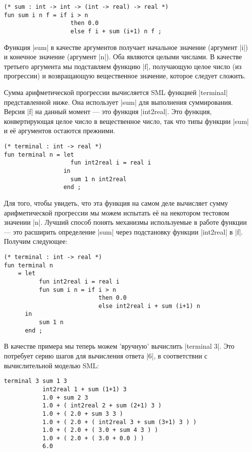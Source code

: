 \begin{lstlisting}[style=customml]
(* sum : int -> int -> (int -> real) -> real *)
fun sum i n f = if i > n
                   then 0.0
                   else f i + sum (i+1) n f ;
\end{lstlisting}

Функция \inline|sum| в качестве аргументов получает начальное значение (аргумент \inline|i|) и конечное значение (аргумент \inline|n|). Оба являются целыми числами. В качестве третьего аргумента мы подставляем функцию \inline|f|, получающую целое число (из прогрессии) и возвращающую вещественное значение, которое следует сложить.

Сумма арифметической прогрессии вычисляется SML функцией \inline|terminal| представленной ниже. Она использует \inline|sum| для выполнения суммирования. Версия \inline|f| на данный момент --- это функция \inline|int2real|. Это функция, конвертирующая целое число в вещественное число, так что типы функции \inline|sum| и её аргументов остаются прежними.

\begin{lstlisting}[style=customml]
(* terminal : int -> real *)
fun terminal n = let
                   fun int2real i = real i
                 in
                   sum 1 n int2real
                 end ;
\end{lstlisting}

Для того, чтобы увидеть, что эта функция на самом деле вычисляет сумму арифметической прогрессии мы можем испытать её на некотором тестовом значении \inline|n|. Лучший способ понять механизмы используемые в работе функции --- это расширить определение \inline|sum| через подстановку функции \inline|int2real| в \inline|f|. Получим следующее:

\begin{lstlisting}[style=customml]
(* terminal : int -> real *)
fun terminal n
    = let
          fun int2real i = real i
          fun sum i n = if i > n
                           then 0.0
                           else int2real i + sum (i+1) n
      in
          sum 1 n
      end ;
\end{lstlisting}

В качестве примера мы теперь можем 'вручную' вычислить \inline|terminal 3|. Это потребует серию шагов для вычисления ответа \inline|6|, в соответствии с вычислительной моделью SML:

\begin{lstlisting}[style=customml]
terminal 3 sum 1 3
           int2real 1 + sum (1+1) 3
           1.0 + sum 2 3
           1.0 + ( int2real 2 + sum (2+1) 3 )
           1.0 + ( 2.0 + sum 3 3 )
           1.0 + ( 2.0 + ( int2real 3 + sum (3+1) 3 ) )
           1.0 + ( 2.0 + ( 3.0 + sum 4 3 ) )
           1.0 + ( 2.0 + ( 3.0 + 0.0 ) )
           6.0
\end{lstlisting}

